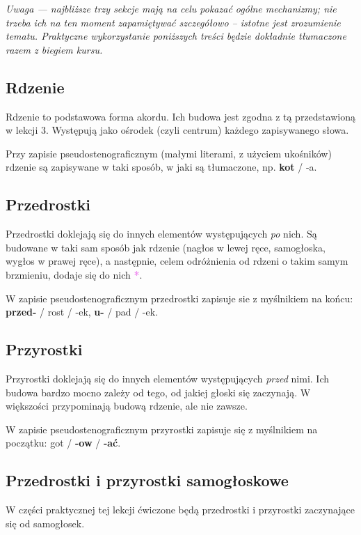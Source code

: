 \documentclass[12p, oneside]{book}
\newcommand{\steno}[1]{\textbf{\textsf{\textcolor{violet}{ #1}}}}
\begin{document}
\emph{Uwaga --- najbliższe trzy sekcje mają na celu pokazać ogólne mechanizmy; nie trzeba ich na ten moment zapamiętywać szczegółowo -- istotne jest zrozumienie tematu. Praktyczne wykorzystanie poniższych treści będzie dokładnie tłumaczone razem z biegiem kursu.}

\subsection*{Rdzenie}

Rdzenie to podstawowa forma akordu. Ich budowa jest zgodna z tą przedstawioną w lekcji 3. Występują jako ośrodek (czyli centrum) każdego zapisywanego słowa.

Przy zapisie pseudostenograficznym (małymi literami, z użyciem ukośników) rdzenie są zapisywane w taki sposób, w jaki są tłumaczone, np. \textbf{kot} / -a.

\subsection*{Przedrostki}

Przedrostki doklejają się do innych elementów występujących \emph{po} nich. Są budowane w taki sam sposób jak rdzenie (nagłos w lewej ręce, samogłoska, wygłos w prawej ręce), a następnie, celem odróżnienia od rdzeni o takim samym brzmieniu, dodaje się do nich \steno{*}.

W zapisie pseudostenograficznym przedrostki zapisuje sie z myślnikiem na końcu: \textbf{przed-} / rost / -ek, \textbf{u-} / pad / -ek.

\subsection*{Przyrostki}

Przyrostki doklejają się do innych elementów występujących \emph{przed} nimi. Ich budowa bardzo mocno zależy od tego, od jakiej głoski się zaczynają. W większości przypominają budową rdzenie, ale nie zawsze.

W zapisie pseudostenograficznym przyrostki zapisuje się z myślnikiem na początku: got / \textbf{-ow} / \textbf{-ać}.

\subsection*{Przedrostki i przyrostki samogłoskowe}

W części praktycznej tej lekcji ćwiczone będą przedrostki i przyrostki zaczynające się od samogłosek.
\end{document}

